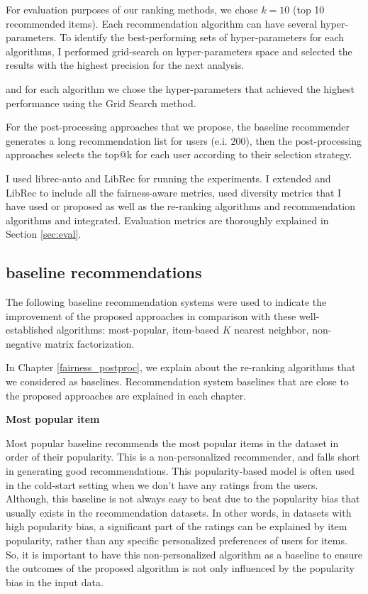     For evaluation purposes of our ranking methods, we chose $k = 10$ (top 10 recommended items). Each recommendation algorithm can have several hyper-parameters. To identify the best-performing sets of hyper-parameters for each algorithms, I performed grid-search on hyper-parameters space and selected the results with the highest precision for the next analysis. 
    
    
    and for each algorithm we chose the hyper-parameters that achieved the highest performance using the Grid Search method.
    
    For the post-processing approaches that we propose, the baseline recommender generates a long recommendation list for users (e.i. 200), then the post-processing approaches selects the top@k for each user according to their selection strategy.
    
    I used librec-auto and LibRec for running the experiments\cite{burke2020facct_libauto,Sonboli2020FARLA,guo2015librec,mansoury2019algorithm,mansoury2018automating}. I extended \libauto{} and LibRec to include all the fairness-aware metrics, used diversity metrics that I have used or proposed as well as the re-ranking algorithms and recommendation algorithms and integrated. Evaluation metrics are thoroughly explained in Section \ref{sec:eval}.

    \subsection{baseline recommendations}
    
        The following baseline recommendation systems were used to indicate the improvement of the proposed approaches in comparison with these well-established algorithms: most-popular, item-based $K$ nearest neighbor, non-negative matrix factorization. 
        
        In Chapter \ref{fairness_postproc}, we explain about the re-ranking algorithms that we considered as baselines. Recommendation system baselines that are close to the proposed approaches are explained in each chapter.
        
        
        \textbf{Most popular item}
        
        Most popular baseline recommends the most popular items in the dataset in order of their popularity. This is a non-personalized recommender, and falls short in generating good recommendations. This popularity-based model is often used in the cold-start setting when we don't have any ratings from the users. Although, this baseline is not always easy to beat due to the popularity bias that usually exists in the recommendation datasets. In other words, in datasets with high popularity bias, a significant part of the ratings can be explained by item popularity, rather than any specific personalized preferences of users for items. So, it is important to have this non-personalized algorithm as a baseline to ensure the outcomes of the proposed algorithm is not only influenced by the popularity bias in the input data.
        
